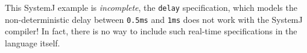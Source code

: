 This SystemJ example is \textit{incomplete}, the \texttt{delay}
specification, which models the non-deterministic delay between
\texttt{0.5ms} and \texttt{1ms} does not work with the SystemJ compiler!
In fact, there is no way to include such real-time specifications in the
language itself.

